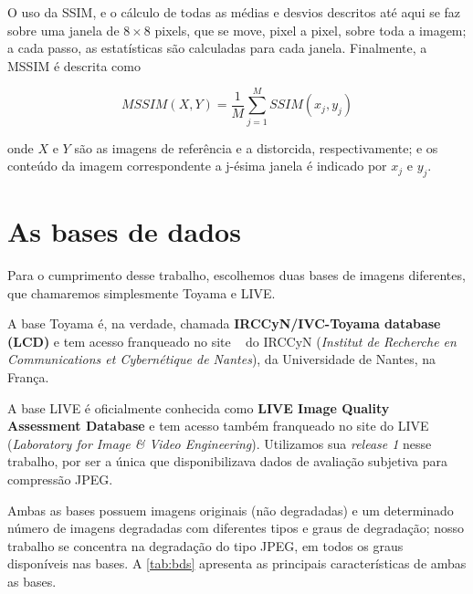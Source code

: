 O uso da SSIM, e o cálculo de todas as médias e desvios descritos até aqui se faz sobre uma janela de $8\times8$ pixels, que se move, pixel a pixel, sobre toda a imagem; a cada passo, as estatísticas são calculadas para cada janela. Finalmente, a MSSIM é descrita como

\begin{equation}\label{eq:mssim}
	MSSIM(X,Y) = \frac{1}{M}\sum^{M}_{j=1}SSIM(x_j,y_j)
\end{equation}

onde $X$ e $Y$ são as imagens de referência e a distorcida, respectivamente; e os conteúdo da imagem correspondente a j-ésima janela é indicado por $x_j$ e $y_j$.

\section{As bases de dados}\label{sec:imdb}

Para o cumprimento desse trabalho, escolhemos duas bases de imagens diferentes, que chamaremos simplesmente Toyama e LIVE.

A base Toyama é, na verdade, chamada \textbf{IRCCyN/IVC-Toyama database (LCD)} e tem acesso franqueado no site ~\cite{Tourancheau2008} do IRCCyN (\emph{Institut de Recherche en Communications et Cybernétique de Nantes}), da Universidade de Nantes, na França.

A base LIVE é oficialmente conhecida como \textbf{LIVE Image Quality Assessment Database} e tem acesso também franqueado no site \cite{livedb} do LIVE (\emph{Laboratory for Image \& Video Engineering}). Utilizamos sua \emph{release 1} nesse trabalho, por ser a única que disponibilizava dados de avaliação subjetiva para compressão JPEG.

Ambas as bases possuem imagens originais (não degradadas) e um determinado número de imagens degradadas com diferentes tipos e graus de degradação; nosso trabalho se concentra na degradação do tipo JPEG, em todos os graus disponíveis nas bases. A \autoref*{tab:bds} apresenta as principais características de ambas as bases. 

